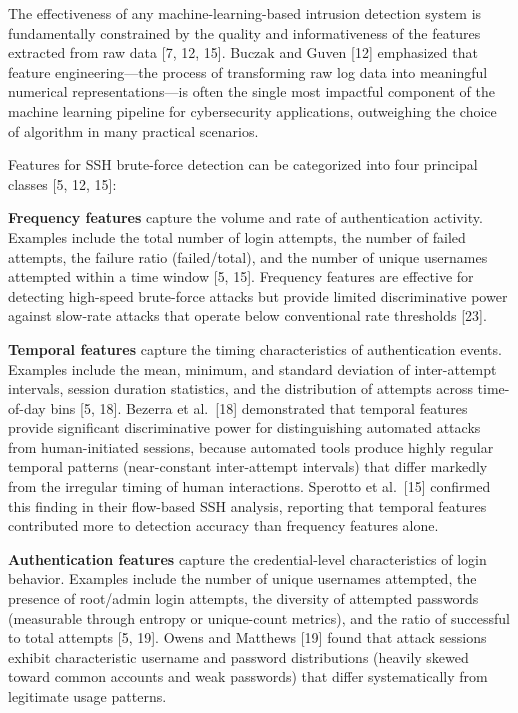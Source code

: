 \documentclass[
  a4paper]{report}
\begin{document}
The effectiveness of any machine-learning-based intrusion detection
system is fundamentally constrained by the quality and informativeness
of the features extracted from raw data {[}7, 12, 15{]}. Buczak and
Guven {[}12{]} emphasized that feature engineering---the process of
transforming raw log data into meaningful numerical representations---is
often the single most impactful component of the machine learning
pipeline for cybersecurity applications, outweighing the choice of
algorithm in many practical scenarios.

Features for SSH brute-force detection can be categorized into four
principal classes {[}5, 12, 15{]}:

\textbf{Frequency features} capture the volume and rate of
authentication activity. Examples include the total number of login
attempts, the number of failed attempts, the failure ratio
(failed/total), and the number of unique usernames attempted within a
time window {[}5, 15{]}. Frequency features are effective for detecting
high-speed brute-force attacks but provide limited discriminative power
against slow-rate attacks that operate below conventional rate
thresholds {[}23{]}.

\textbf{Temporal features} capture the timing characteristics of
authentication events. Examples include the mean, minimum, and standard
deviation of inter-attempt intervals, session duration statistics, and
the distribution of attempts across time-of-day bins {[}5, 18{]}.
Bezerra et al.~{[}18{]} demonstrated that temporal features provide
significant discriminative power for distinguishing automated attacks
from human-initiated sessions, because automated tools produce highly
regular temporal patterns (near-constant inter-attempt intervals) that
differ markedly from the irregular timing of human interactions.
Sperotto et al.~{[}15{]} confirmed this finding in their flow-based SSH
analysis, reporting that temporal features contributed more to detection
accuracy than frequency features alone.

\textbf{Authentication features} capture the credential-level
characteristics of login behavior. Examples include the number of unique
usernames attempted, the presence of root/admin login attempts, the
diversity of attempted passwords (measurable through entropy or
unique-count metrics), and the ratio of successful to total attempts
{[}5, 19{]}. Owens and Matthews {[}19{]} found that attack sessions
exhibit characteristic username and password distributions (heavily
skewed toward common accounts and weak passwords) that differ
systematically from legitimate usage patterns.
\end{document}
